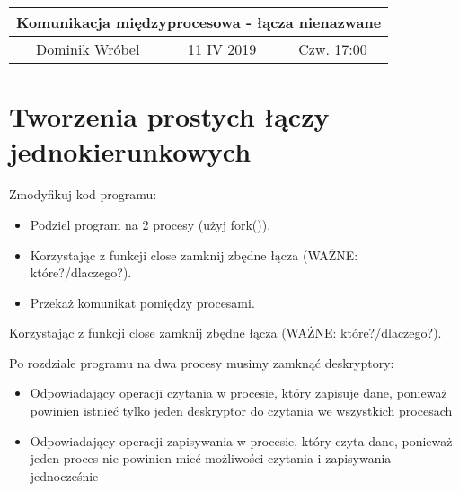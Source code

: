 \documentclass[a4paper,15pt]{article}
\newcommand{\ask}[2]{
    \begin{tcolorbox}[colback=black!5!white,colframe=gray,title={Pytanie #1}]
        #2
    \end{tcolorbox}
}
\newcommand{\assignment}[2]{
    \begin{tcolorbox}[colback=black!5!white,colframe=black,title={Zadanie #1}]
        #2
    \end{tcolorbox}
}
\begin{document}
\begin{table}
\begin{center}
\begin{tabular}{|c|c|c|}
\hline
\multicolumn{3}{|c|}{\textbf{Komunikacja międzyprocesowa - łącza nienazwane}} \\ \hline Dominik Wróbel & 11 IV 2019 & Czw. 17:00 \\ \hline

\end{tabular}
\end{center}
\end{table}

\tableofcontents

\newpage
\section{Tworzenia prostych łączy jednokierunkowych}


\assignment{1.1 1.2 1.3}{ Zmodyfikuj kod programu:
\begin{itemize}
\item Podziel program na 2 procesy (użyj fork()).
\item Korzystając z funkcji close zamknij zbędne łącza (WAŻNE: które?/dlaczego?).
\item Przekaż komunikat pomiędzy procesami.
\end{itemize}
}
\ask{1.3}{
Korzystając z funkcji close zamknij zbędne łącza (WAŻNE: które?/dlaczego?).
}
Po rozdziale programu na dwa procesy musimy zamknąć deskryptory:
\begin{itemize}
\item Odpowiadający operacji czytania w procesie, który zapisuje dane, ponieważ powinien istnieć tylko jeden deskryptor do czytania we wszystkich procesach
\item Odpowiadający operacji zapisywania w procesie, który czyta dane, ponieważ jeden proces nie powinien mieć możliwości czytania i zapisywania jednocześnie
\end{itemize}
\end{document}
